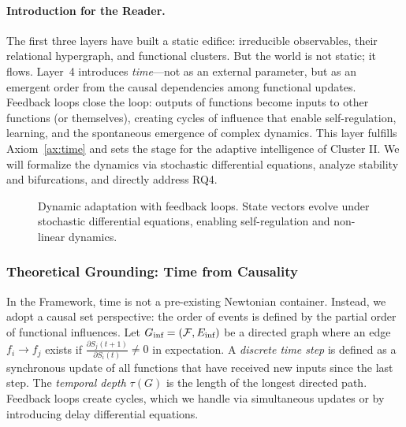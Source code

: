 \paragraph{Introduction for the Reader.}
The first three layers have built a static edifice: irreducible observables, their relational hypergraph, and functional clusters. But the world is not static; it flows. Layer~4 introduces \emph{time}—not as an external parameter, but as an emergent order from the causal dependencies among functional updates. Feedback loops close the loop: outputs of functions become inputs to other functions (or themselves), creating cycles of influence that enable self-regulation, learning, and the spontaneous emergence of complex dynamics. This layer fulfills Axiom~\ref{ax:time} and sets the stage for the adaptive intelligence of Cluster II. We will formalize the dynamics via stochastic differential equations, analyze stability and bifurcations, and directly address RQ4.

\begin{figure}[htbp]
    \centering
    \caption{Dynamic adaptation with feedback loops. State vectors evolve under stochastic differential equations, enabling self-regulation and non-linear dynamics.}
    \label{fig:layer4}
\end{figure}

\subsubsection{Theoretical Grounding: Time from Causality}
In the \Apeiron{} Framework, time is not a pre-existing Newtonian container. Instead, we adopt a causal set perspective: the order of events is defined by the partial order of functional influences. Let $G_{\text{inf}} = (\mathcal{F}, E_{\text{inf}})$ be a directed graph where an edge $f_i \to f_j$ exists if $\frac{\partial S_j(t+1)}{\partial S_i(t)} \neq 0$ in expectation. A \emph{discrete time step} is defined as a synchronous update of all functions that have received new inputs since the last step. The \emph{temporal depth} $\tau(G)$ is the length of the longest directed path. Feedback loops create cycles, which we handle via simultaneous updates or by introducing delay differential equations.

